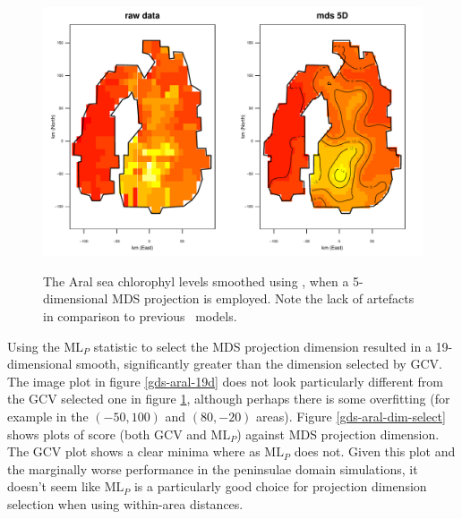 \begin{figure}
\centering
\includegraphics[width=6in]{mds/figs/aral-5d-duchon.pdf} \\
\caption{The Aral sea chlorophyl levels smoothed using \mdsds, when a 5-dimensional MDS projection is employed. Note the lack of artefacts in comparison to previous \mdsap\ models.}
\label{mds-aral-5d-duchon}
\end{figure}

Using the $\text{ML}_P$ statistic to select the MDS projection dimension resulted in a 19-dimensional smooth, significantly greater than the dimension selected by GCV. The image plot in figure \ref{gds-aral-19d} does not look particularly different from the GCV selected one in figure \ref{mds-aral-5d-duchon}, although perhaps there is some overfitting (for example in the $(-50,100)$ and $(80,-20)$ areas). Figure \ref{gds-aral-dim-select} shows plots of score (both GCV and $\text{ML}_P$) against MDS projection dimension. The GCV plot shows a clear minima where as $\text{ML}_P$ does not. Given this plot and the marginally worse performance in the peninsulae domain simulations, it doesn't seem like $\text{ML}_P$ is a particularly good choice for projection dimension selection when using within-area distances.

